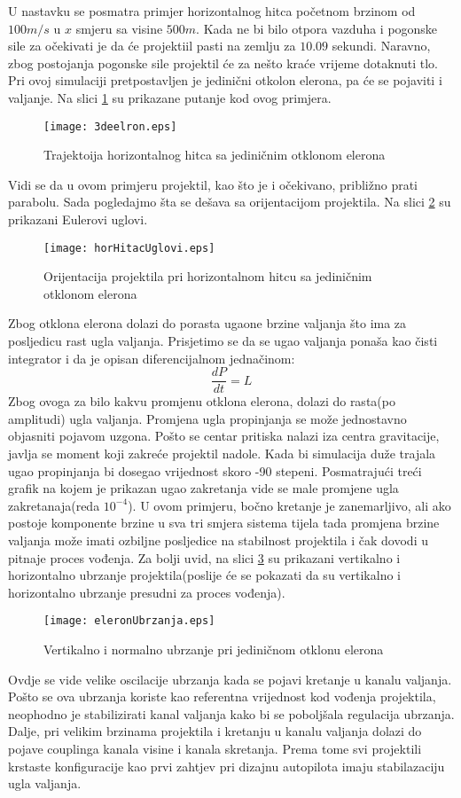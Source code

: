 U nastavku se posmatra primjer horizontalnog hitca početnom brzinom od $100m/s$ u $x$ smjeru
sa visine $500m$. Kada ne bi bilo otpora vazduha i pogonske sile za očekivati je da će projektiil pasti na zemlju 
za $10.09$ sekundi. Naravno, zbog postojanja pogonske sile projektil će za nešto kraće vrijeme 
dotaknuti tlo. Pri ovoj simulaciji pretpostavljen je jedinični otkolon elerona, pa će se pojaviti i valjanje. 
Na slici \ref{fig:eleronPutanja} su prikazane putanje kod ovog primjera. 
\begin{figure}[!ht]
    \centering
    \texttt{[image: 3deelron.eps]}
    \caption{Trajektoija horizontalnog hitca sa jediničnim otklonom elerona}
    \label{fig:eleronPutanja}
\end{figure}
Vidi se da u ovom primjeru projektil, kao što je i očekivano, približno prati parabolu. 
Sada pogledajmo šta se dešava sa orijentacijom projektila. Na slici \ref{fig:orijentacijaEleron}
su prikazani Eulerovi uglovi. 
\begin{figure}[!ht]
    \centering
    \texttt{[image: horHitacUglovi.eps]}
    \caption{Orijentacija projektila pri horizontalnom hitcu sa jediničnim otklonom elerona}
    \label{fig:orijentacijaEleron}
\end{figure}
Zbog otklona elerona dolazi do porasta ugaone brzine valjanja što ima za posljedicu 
rast ugla valjanja. Prisjetimo se da se ugao valjanja ponaša kao čisti integrator i da je 
opisan diferencijalnom jednačinom:
\begin{equation*}
    \frac{dP}{dt} = L
\end{equation*}
Zbog ovoga za bilo kakvu promjenu otklona elerona, dolazi do rasta(po amplitudi) ugla valjanja. 
Promjena ugla propinjanja se može jednostavno objasniti pojavom uzgona. Pošto se centar pritiska nalazi 
iza centra gravitacije, javlja se moment koji zakreće projektil nadole. Kada bi simulacija duže trajala 
ugao propinjanja bi dosegao vrijednost skoro -90 stepeni. Posmatrajući treći grafik na kojem 
je prikazan ugao zakretanja vide se male promjene ugla zakretanaja(reda $10^{-4}$). U ovom primjeru,
bočno kretanje je zanemarljivo, ali ako postoje komponente brzine u sva tri smjera sistema tijela tada 
promjena brzine valjanja može imati ozbiljne posljedice na stabilnost projektila i čak dovodi u pitnaje proces vođenja.
Za bolji uvid, na slici \ref{fig:eleronUbrzanja} su prikazani vertikalno i horizontalno ubrzanje projektila(poslije će se pokazati 
da su vertikalno i horizontalno ubrzanje presudni za proces vođenja).  
\begin{figure}[!ht]
    \centering
    \texttt{[image: eleronUbrzanja.eps]}
    \caption{Vertikalno i normalno ubrzanje pri jediničnom otklonu elerona}
    \label{fig:eleronUbrzanja}
\end{figure}
Ovdje se vide velike oscilacije ubrzanja kada se pojavi kretanje u kanalu valjanja. Pošto se 
ova ubrzanja koriste kao referentna vrijednost kod vođenja projektila, neophodno je stabilizirati 
kanal valjanja kako bi se poboljšala regulacija ubrzanja. 
Dalje, pri velikim brzinama projektila i kretanju u kanalu valjanja dolazi do pojave couplinga 
kanala visine i kanala skretanja. Prema tome svi projektili krstaste konfiguracije 
kao prvi zahtjev pri dizajnu autopilota imaju stabilazaciju ugla valjanja. 

